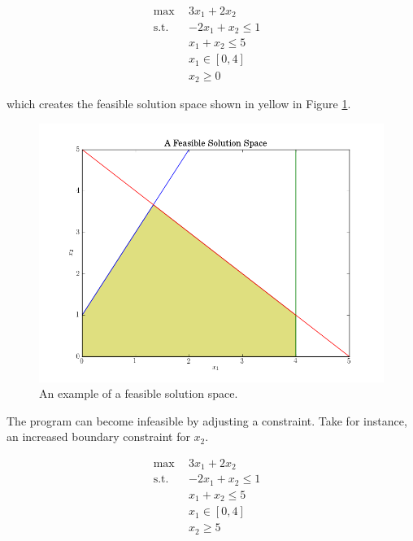 \begin{subequations}\label{eqs:feas}
  \begin{align}
    \max \:\: & 
    3 x_1 + 2 x_2
    & \label{eqs:feas_obj} \\
    \text{s.t.} \:\: &
    -2 x_1 + x_2 \leq 1 \\
    &
    x_1 + x_2 \leq 5 
    & \label{eqs:feas_sup} \\
    &
    x_1 \in [0, 4]
    &\label{eqs:feas_x1} \\
    &
    x_2 \geq 0
    &\label{eqs:feas_x2}
  \end{align}
\end{subequations}

which creates the feasible solution space shown in yellow in
Figure \ref{fig:feasible}.

\begin{figure}[H]
  \begin{center}
    \includegraphics[width=\linewidth]{./chapters/litreview/plots/feasible.png}
  \caption{An example of a feasible solution space.}
  \label{fig:feasible}
  \end{center}
\end{figure}

The program can become infeasible by adjusting a constraint. Take for instance,
an increased boundary constraint for $x_2$.

\begin{subequations}\label{eqs:infeas}
  \begin{align}
    \max \:\: & 
    3 x_1 + 2 x_2
    & \label{eqs:infeas_obj} \\
    \text{s.t.} \:\: &
    -2 x_1 + x_2 \leq 1 \\
    &
    x_1 + x_2 \leq 5 
    & \label{eqs:infeas_sup} \\
    &
    x_1 \in [0, 4]
    &\label{eqs:infeas_x1} \\
    &
    x_2 \geq 5
    &\label{eqs:infeas_x2}
  \end{align}
\end{subequations}

